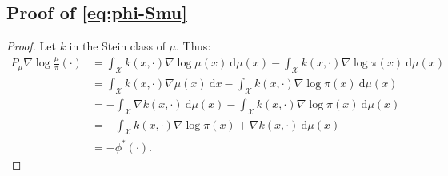 \documentclass{article}
\newcommand{\X}{\mathcal{X}}
\renewcommand{\d}{\: \mathrm{d}}
\begin{document}
\subsection{Proof of \eqref{eq:phi-Smu}}\label{pro:phi-Smu}
\begin{proof}
    Let $k$ in the Stein class of $\mu$. Thus:
    \begin{equation}
      \begin{split}
        P_\mu \nabla \log \frac{\mu}{\pi} (\cdot) &=
          \int_\X k(x, \cdot) \nabla \log \mu(x) \d \mu(x) - \int_\X k(x, \cdot) \nabla \log \pi (x) \d \mu(x) \\
        &= \int_\X k(x, \cdot) \nabla \mu(x) \d x - \int_\X k(x, \cdot) \nabla \log \pi (x) \d \mu(x) \\
        &= - \int_\X \nabla k(x, \cdot) \d \mu(x) - \int_\X k(x, \cdot) \nabla \log \pi (x) \d \mu(x) \\
        &= - \int_\X k(x, \cdot) \nabla \log \pi (x) + \nabla k(x, \cdot) \d \mu(x) \\
        &= -\phi^*(\cdot).
      \end{split}
    \end{equation}
\end{proof}
\end{document}

